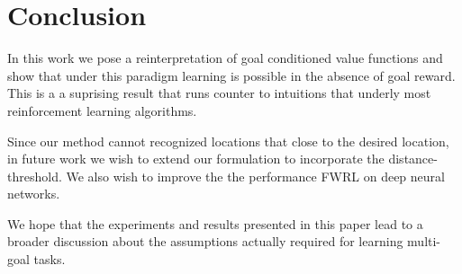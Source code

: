 \section{Conclusion}
In this work we pose a reinterpretation of goal conditioned value
functions and show that under this paradigm learning is possible in the
absence of goal reward. This is a a suprising result that runs counter
to intuitions that underly most reinforcement learning algorithms.  

Since our method cannot recognized locations that close to the desired
location, in future work we wish to extend our formulation to
incorporate the distance-threshold. We also wish to improve the
the performance FWRL on deep neural networks. 

We hope that the experiments and results presented in this paper  lead
to a broader discussion about the assumptions actually required for
learning multi-goal tasks.
